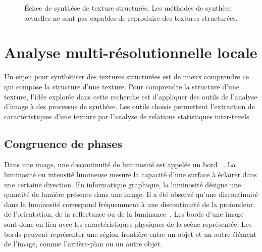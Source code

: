 \begin{figure}
    \caption[Échec de synthèse de texture structurée]{Échec de synthèse de texture structurée. Les méthodes de synthèse actuelles ne sont pas capables de reproduire des textures structurées.}
    \label{fig:synthesis-failure}
\end{figure}

\section{Analyse multi-résolutionnelle locale}

Un enjeu pour synthétiser des textures structurées est de mieux comprendre ce qui compose la structure d'une texture. Pour comprendre la structure d'une texture, l'idée explorée dans cette recherche est d'appliquer des outils de l'analyse d'image à des processus de synthèse. Les outils choisis permettent l'extraction de caractéristiques d'une texture par l'analyse de relations statistiques inter-texels.

\subsection*{Congruence de phases}

Dans une image, une discontinuité de luminosité est appelée un \og bord \fg~\cite{torre_edge_1986}. La luminosité ou intensité lumineuse mesure la capacité d'une surface à éclairer dans une certaine direction. En informatique graphique, la luminosité désigne une quantité de lumière présente dans une image. Il a été observé qu'une discontinuité dans la luminosité correspond fréquemment à une discontinuité de la profondeur, de l'orientation, de la reflectance ou de la luminance~\cite{lindeberg_edge_1998}. Les bords d'une image sont donc en lien avec les caractéristiques physiques de la scène représentée. Les bords peuvent représenter une région frontière entre un objet et un autre élément de l'image, comme l'arrière-plan ou un autre objet.

\bigskip

